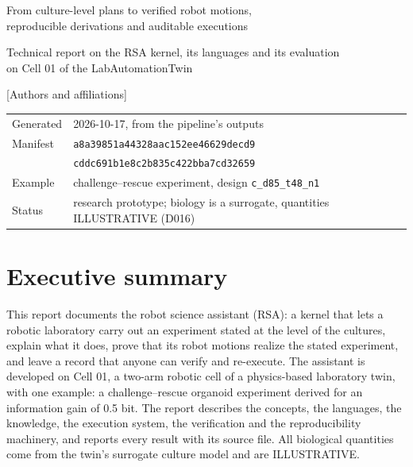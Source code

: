 \documentclass[10pt,a4paper]{article}
\begin{document}
\begin{titlepage}
\sffamily
\vspace*{2.2cm}
\noindent{\color{teal!55!black}\rule{\linewidth}{1.2pt}}\par\vspace{0.6cm}
\vspace{0.4cm}
{\Large From culture-level plans to verified robot motions,\\ reproducible derivations and auditable executions\par}\vspace{0.6cm}
\noindent{\color{teal!55!black}\rule{\linewidth}{1.2pt}}\par\vspace{1.0cm}
{\large Technical report on the RSA kernel, its languages and its evaluation\\ on Cell 01 of the LabAutomationTwin\par}
\vspace{1.4cm}
{\normalsize [Authors and affiliations]\par}
\vfill
{\small\rmfamily
\begin{tabular}{@{}ll@{}}
Generated & 2026-10-17, from the pipeline's outputs \\
Manifest & \texttt{a8a39851a44328aac152ee46629decd9} \\
         & \texttt{cddc691b1e8c2b835c422bba7cd32659} \\
Example & challenge--rescue experiment, design \texttt{c\_\allowbreak{}d85\_\allowbreak{}t48\_\allowbreak{}n1} \\
Status & research prototype; biology is a surrogate, quantities ILLUSTRATIVE (D016) \\
\end{tabular}\par}
\end{titlepage}
\tableofcontents
\clearpage
{}

\section{Executive summary}\label{sec:summary}

This report documents the robot science assistant (RSA): a kernel that lets a robotic laboratory carry out an experiment stated at the level of the cultures, explain what it does, prove that its robot motions realize the stated experiment, and leave a record that anyone can verify and re-execute. The assistant is developed on Cell 01, a two-arm robotic cell of a physics-based laboratory twin, with one example: a challenge–rescue organoid experiment derived for an information gain of 0.5 bit. The report describes the concepts, the languages, the knowledge, the execution system, the verification and the reproducibility machinery, and reports every result with its source file. All biological quantities come from the twin's surrogate culture model and are ILLUSTRATIVE.
\end{document}
